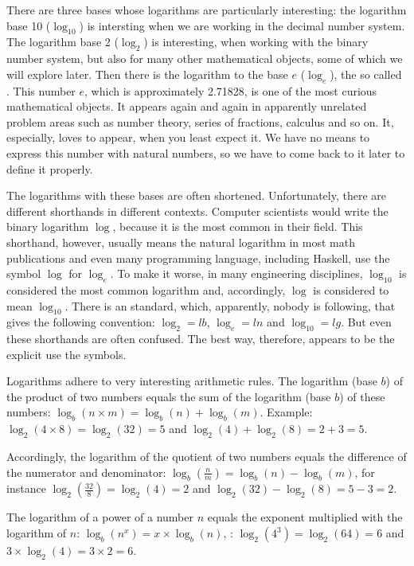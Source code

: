 \documentclass{scrreprt}
\begin{document}
There are three bases whose logarithms are
particularly interesting:
the logarithm base 10 ($\log_{10}$)
is intersting when we are working in the decimal
number system.
The logarithm base 2 ($\log_2$)
is interesting,
when working with the binary number system,
but also for many other mathematical objects,
some of which we will explore later.
Then there is the logarithm to the base $e$ ($\log_e$),
the so called .
This number $e$, which is approximately 2.71828,
is one of the most curious mathematical objects.
It appears again and again in apparently unrelated 
problem areas such as number theory, series of fractions, calculus
and so on. It, especially, loves to appear,
when you least expect it.
We have no means to express this number 
with natural numbers, so we have to come back to it later
to define it properly.

The logarithms with these bases are often shortened.
Unfortunately, there are different shorthands
in different contexts.
Computer scientists would write the binary logarithm
$\log$, because it is the most common in their field.
This shorthand, however, usually means the natural logarithm
in most math publications and even many programming
language, including Haskell, use the symbol $\log$
for $\log_e$.
To make it worse, in many engineering disciplines,
$\log_{10}$ is considered the most common logarithm
and, accordingly, $\log$ is considered to mean $\log_{10}$.
There is an  standard, which, apparently,
nobody is following, that gives the following
convention: $\log_2 = lb$, $\log_e = ln$ and $\log_{10} = lg$.
But even these shorthands are often confused.
The best way, therefore, appears to be
the explicit use the symbols.

Logarithms adhere to very interesting arithmetic rules.
The logarithm (base $b$) of the product of two numbers
equals the sum of the logarithm (base $b$) of these numbers:
$\log_b(n \times m) = \log_b(n) + \log_b(m)$.
Example: $\log_2(4 \times 8) = \log_2(32) = 5$ and
$\log_2(4) + \log_2(8) = 2 + 3 = 5$.

Accordingly, the logarithm of the quotient of two numbers
equals the difference of the numerator and denominator:
$\log_b(\frac{n}{m}) = \log_b(n) - \log_b(m)$, for instance
$\log_2(\frac{32}{8}) = \log_2(4) = 2$ and
$\log_2(32) - \log_2(8) = 5 - 3 = 2$.

The logarithm of a power of a number $n$ 
equals the exponent multiplied with the logarithm of $n$:
$\log_b(n^x) = x \times \log_b(n)$, \eg:
$\log_2(4^3) = \log_2(64) = 6$ and
$3 \times \log_2(4) = 3 \times 2 = 6$.
\end{document}
